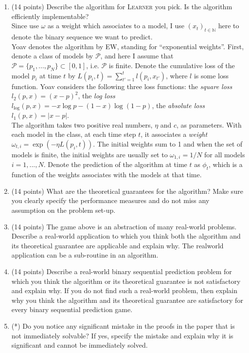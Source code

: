\documentclass[a4paper, 12pt]{article}
\newcommand{\N}{\mathbb{N}}
\begin{document}
\begin{enumerate}
    \item (14 points) Describe the algorithm for \textsc{Learner} you pick. Is the algorithm efficiently implementable?
    \\ {\color{blue} Since \cite{freund2003predicting} use $\omega$ as a weight which associates to a model, I use $(x_t)_{t\in\N}$ here to denote the binary sequence we want to predict.
    \\ Yoav denotes the algorithm by EW, standing for ``exponential weights''. First, denote a class of models by $\mathcal{P}$, and here I assume that $\mathcal{P} = \{p_1, ..., p_N\} \subset [0, 1]$, i.e. $\mathcal{P}$ is finite. Denote the cumulative loss of the model $p_i$ at time $t$ by $L(p_i, t) = \sum_{t'=1}^t l(p_i, x_{t'})$, where $l$ is some loss function. Yoav considers the following three loss functions: the \textit{square loss} $l_2(p, x) = (x - p)^2$, the \textit{log loss} $l_{\log}(p, x) = -x \log p -(1-x) \log (1-p)$, the \textit{absolute loss} $l_1(p, x) = |x - p|$.
    \\ The algorithm takes two positive real numbers, $\eta$ and $c$, as parameters. With each model in the class, at each time step $t$, it associates a \textit{weight} $\omega_{t,i}=\exp(-\eta L(p_i, t))$. The initial weights sum to 1 and when the set of models is finite, the initial weights are usually set to $\omega_{1, i}=1/N$ for all models $i=1, ..., N$. Denote the prediction of the algorithm at time $t$ as $\phi_t$, which is a function of the weights associates with the models at that time.
    }
    \item (14 points) What are the theoretical guarantees for the algorithm? Make sure you clearly specify the performance measures and do not miss any assumption on the problem set-up.
    \item (14 points) The game above is an abstraction of many real-world problems. Describe a real-world application
    to which you think both the algorithm and its theoretical guarantee are applicable and explain why. The realworld application can be a sub-routine in an algorithm.
    \item (14 points) Describe a real-world binary sequential prediction problem for which you think the algorithm
    or its theoretical guarantee is not satisfactory and explain why. If you do not find such a real-world problem, then explain why you think the algorithm and its theoretical guarantee are satisfactory for every binary
    sequential prediction game.
    \item (*) Do you notice any significant mistake in the proofs in the paper that is not immediately solvable? If yes,
    specify the mistake and explain why it is significant and cannot be immediately solved.
\end{enumerate}

\printbibliography
\end{document}
